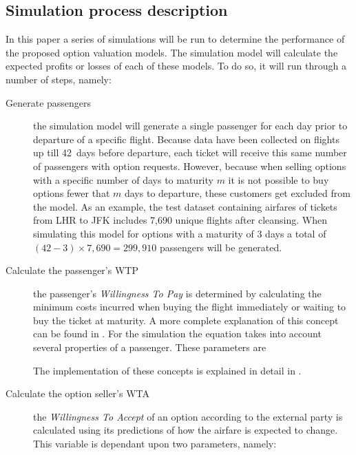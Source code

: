 \subsection{Simulation process description}
In this paper a series of simulations will be run to determine the performance of the proposed option valuation models. The simulation model will calculate the expected profits or losses of each of these models. To do so, it will run through a number of steps, namely:

\begin{description}
\item[Generate passengers] the simulation model will generate a single passenger for each day prior to departure of a specific flight. Because data have been collected on flights up till 42~days before departure, each ticket will receive this same number of passengers with option requests. However, because when selling options with a specific number of days to maturity $m$ it is not possible to buy options fewer that $m$ days to departure, these customers get excluded from the model. As an example, the test dataset containing airfares of tickets from LHR to JFK includes 7,690 unique flights after cleansing. When simulating this model for options with a maturity of 3 days a total of $(42 - 3) \times 7,690 = 299,910$ passengers will be generated.
\item[Calculate the passenger's WTP] the passenger's \emph{Willingness To Pay} is determined by calculating the minimum costs incurred when buying the flight immediately or waiting to buy the ticket at maturity. A more complete explanation of this concept can be found in . For the simulation the equation takes into account several properties of a passenger. These parameters are  The implementation of these concepts is explained in detail in .
\item[Calculate the option seller's WTA] the \emph{Willingness To Accept} of an option according to the external party is calculated using its predictions of how the airfare is expected to change. This variable is dependant upon two parameters, namely: \begin{inparaenum}

\end{inparaenum}
\end{description}
